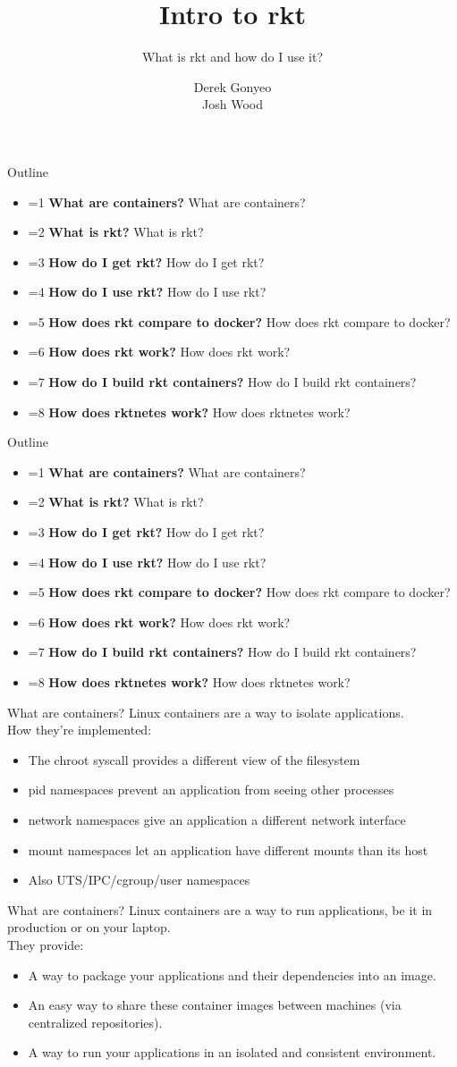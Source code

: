 \documentclass[pdf,aspectratio=169,14pt]{beamer}
\title{Intro to rkt}
\subtitle{What is rkt and how do I use it?}
\author{Derek Gonyeo \\ Josh Wood}
\newcommand{\mbold}[3]{
    \ifnum #1=#2
        \textbf{#3}
    \else
        #3
    \fi
}
\newcommand{\outline}[1]{
    \begin{frame}
        Outline
        \begin{itemize}
            \item \mbold{#1}{1}{What are containers?}
            \item \mbold{#1}{2}{What is rkt?}
            \item \mbold{#1}{3}{How do I get rkt?}
            \item \mbold{#1}{4}{How do I use rkt?}
            \item \mbold{#1}{5}{How does rkt compare to docker?}
            \item \mbold{#1}{6}{How does rkt work?}
            \item \mbold{#1}{7}{How do I build rkt containers?}
            \item \mbold{#1}{8}{How does rktnetes work?}
        \end{itemize}
    \end{frame}
}
\begin{document}

\begin{frame}
    \titlepage
\end{frame}

\outline{0}


\outline{1}

\begin{frame}{What are containers?}
    Linux containers are a way to isolate applications. \\
    \vspace{1em}
    \pause
    How they're implemented:
    \begin{itemize}
        \pause
        \item The chroot syscall provides a different view of the filesystem
        \pause
        \item pid namespaces prevent an application from seeing other processes
        \pause
        \item network namespaces give an application a different network
            interface
        \pause
        \item mount namespaces let an application have different mounts than
            its host
        \pause
        \item Also UTS/IPC/cgroup/user namespaces
    \end{itemize}
\end{frame}

\begin{frame}{What are containers?}
    Linux containers are a way to run applications, be it in production or on
    your laptop. \\
    \vspace{1em}
    \pause
    They provide:
    \begin{itemize}
        \pause
        \item A way to package your applications and their dependencies into an
            image.
        \pause
        \item An easy way to share these container images between machines (via
            centralized repositories).
        \pause
        \item A way to run your applications in an isolated and consistent
            environment.
    \end{itemize}
\end{frame}

\end{document}
